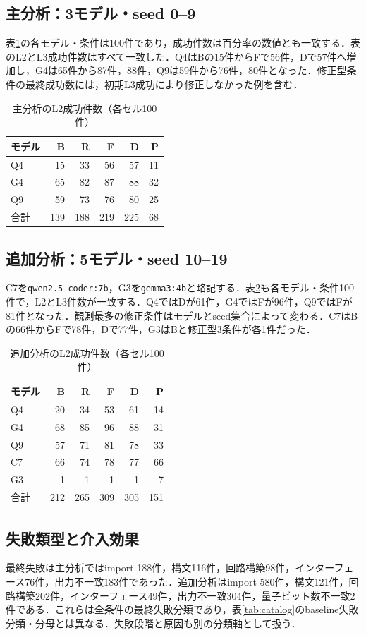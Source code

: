 \documentclass[a4paper,8pt,twocolumn]{extarticle}
\begin{document}
\subsection{主分析：3モデル・seed 0--9}
表\ref{tab:primary}の各モデル・条件は100件であり，成功件数は百分率の数値とも一致する．表のL2とL3成功件数はすべて一致した．Q4はBの15件からFで56件，Dで57件へ増加し，G4は65件から87件，88件，Q9は59件から76件，80件となった．修正型条件の最終成功数には，初期L3成功により修正しなかった例を含む．
\begin{table}[t]
\centering
\caption{主分析のL2成功件数（各セル100件）}
\label{tab:primary}
\begin{tabular}{l|rrrrr}
\hline
モデル & B & R & F & D & P \\
\hline
Q4 & 15 & 33 & 56 & 57 & 11 \\
G4 & 65 & 82 & 87 & 88 & 32 \\
Q9 & 59 & 73 & 76 & 80 & 25 \\
\hline
合計 & 139 & 188 & 219 & 225 & 68 \\
\hline
\end{tabular}
\end{table}
\subsection{追加分析：5モデル・seed 10--19}
C7を\texttt{qwen2.5-coder:7b}，G3を\texttt{gemma3:4b}と略記する．表\ref{tab:additional}も各モデル・条件100件で，L2とL3件数が一致する．Q4ではDが61件，G4ではFが96件，Q9ではFが81件となった．観測最多の修正条件はモデルとseed集合によって変わる．C7はBの66件からFで78件，Dで77件，G3はBと修正型3条件が各1件だった．
\begin{table}[t]
\centering
\caption{追加分析のL2成功件数（各セル100件）}
\label{tab:additional}
\begin{tabular}{l|rrrrr}
\hline
モデル & B & R & F & D & P \\
\hline
Q4 & 20 & 34 & 53 & 61 & 14 \\
G4 & 68 & 85 & 96 & 88 & 31 \\
Q9 & 57 & 71 & 81 & 78 & 33 \\
C7 & 66 & 74 & 78 & 77 & 66 \\
G3 & 1 & 1 & 1 & 1 & 7 \\
\hline
合計 & 212 & 265 & 309 & 305 & 151 \\
\hline
\end{tabular}
\end{table}
\subsection{失敗類型と介入効果}
最終失敗は主分析ではimport 188件，構文116件，回路構築98件，インターフェース76件，出力不一致183件であった．追加分析はimport 580件，構文121件，回路構築202件，インターフェース49件，出力不一致304件，量子ビット数不一致2件である．これらは全条件の最終失敗分類であり，表\ref{tab:catalog}のbaseline失敗分類・分母とは異なる．失敗段階と原因も別の分類軸として扱う．
\end{document}
